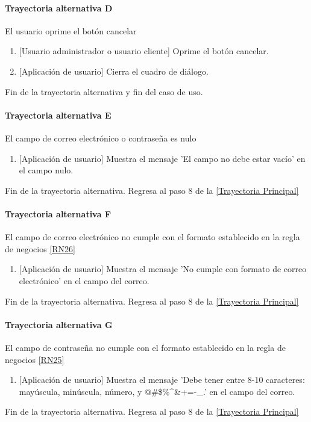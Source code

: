 \paragraph{Trayectoria alternativa D} \label{SUB-U-CU1.4:TD}
    El usuario oprime el botón cancelar
    \begin{enumerate}[label=D\arabic*.]
		\item {[Usuario administrador o usuario cliente]} Oprime el botón cancelar.
		\item {[Aplicación de usuario]} Cierra el cuadro de diálogo.
	\end{enumerate}
	Fin de la trayectoria alternativa y fin del caso de uso.
	
\paragraph{Trayectoria alternativa E} \label{SUB-U-CU1.4:TE}
    El campo de correo electrónico o contraseña es nulo
    \begin{enumerate}[label=D\arabic*.]
		\item {[Aplicación de usuario]} Muestra el mensaje 'El campo no debe estar vacío' en el campo nulo.
	\end{enumerate}
	Fin de la trayectoria alternativa. Regresa al paso 8 de la \hyperref[SUB-U-CU1.4:TP]{[Trayectoria Principal]}
	
\paragraph{Trayectoria alternativa F} \label{SUB-U-CU1.4:TF}
    El campo de correo electrónico no cumple con el formato establecido en la regla de negocios \ref{RN26}
    \begin{enumerate}[label=D\arabic*.]
		\item {[Aplicación de usuario]} Muestra el mensaje 'No cumple con formato de correo electrónico' en el campo del correo.
	\end{enumerate}
	Fin de la trayectoria alternativa. Regresa al paso 8 de la \hyperref[SUB-U-CU1.4:TP]{[Trayectoria Principal]}
	
\paragraph{Trayectoria alternativa G} \label{SUB-U-CU1.4:TG}
    El campo de contraseña no cumple con el formato establecido en la regla de negocios \ref{RN25}
    \begin{enumerate}[label=D\arabic*.]
		\item {[Aplicación de usuario]} Muestra el mensaje 'Debe tener entre 8-10 caracteres: mayúscula, minúscula, número, y @\#\$\%\textasciicircum{}\&+=-\_.' en el campo del correo.
	\end{enumerate}
	Fin de la trayectoria alternativa. Regresa al paso 8 de la \hyperref[SUB-U-CU1.4:TP]{[Trayectoria Principal]}
	
